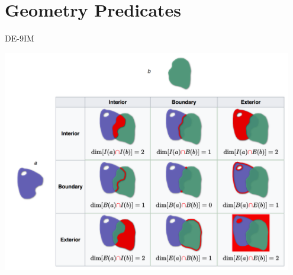 \documentclass[11pt,ignorenonframetext,]{beamer}
\begin{document}
\section{Geometry Predicates}\label{geometry-predicates}

\begin{frame}[t]{DE-9IM}

\begin{center}
\includegraphics[width=0.95\textwidth]{figs/de_9im.png}
\end{center}

\end{frame}
\end{document}
